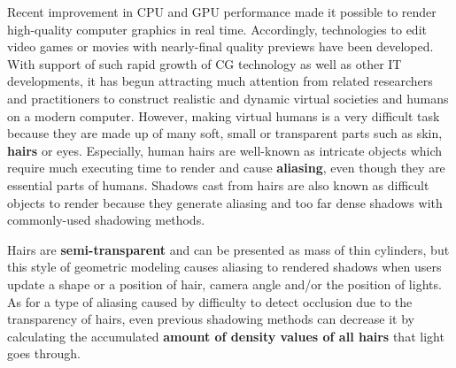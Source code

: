 Recent improvement in CPU and GPU performance made it possible to render high-quality computer graphics in real time.
%
Accordingly, technologies to edit video games or movies with nearly-final quality previews have been developed.
%
With support of such rapid growth of CG technology as well as other IT developments, it has begun attracting much attention from related researchers and practitioners to construct realistic and dynamic virtual societies and humans on a modern computer.
%
However, making virtual humans is a very difficult task because they are made up of many soft, small or transparent parts such as skin, \textbf{hairs} or eyes.
%
Especially, human hairs are well-known as intricate objects which require much executing time to render and cause \textbf{aliasing}, even though they are essential parts of humans.
%
Shadows cast from hairs are also known as difficult objects to render because they generate aliasing and too far dense shadows with commonly-used shadowing methods.\par
%
Hairs are \textbf{semi-transparent} and can be presented as mass of thin cylinders, but this style of geometric modeling causes aliasing to rendered shadows when users update a shape or a position of hair, camera angle and/or the position of lights.
%
As for a type of aliasing caused by difficulty to detect occlusion due to the transparency of hairs, even previous shadowing methods can decrease it by calculating the accumulated \textbf{amount of density values of all hairs} that light goes through.
%
